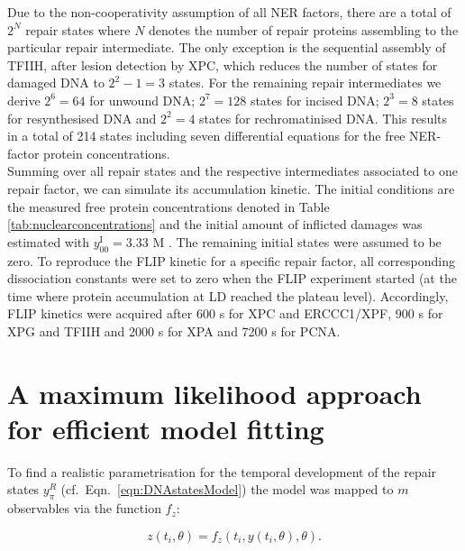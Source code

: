 Due to the non-cooperativity assumption of all NER factors, there are a total of $2^N$ repair states where $N$ denotes the number of repair proteins assembling to the particular repair intermediate. The only exception is the sequential assembly of TFIIH, after lesion detection by XPC, which reduces the number of states for damaged DNA to $ 2^2-1 = 3$ states. For the remaining repair intermediates we derive  $ 2^6 = 64$ for unwound DNA; $ 2^7 = 128$ states for incised DNA; $ 2^3 = 8$ states for resynthesised DNA and $ 2^2 = 4$ states for rechromatinised DNA. This results in a total of 214 states including seven differential equations for the free NER-factor protein concentrations. \\
Summing over all repair states and the respective intermediates associated to one repair factor, we can simulate its accumulation kinetic. The initial conditions are the measured free protein concentrations denoted in Table \ref{tab:nuclearconcentrations}\cite{Terstiege2010,Luijsterburg2010} and the initial amount of inflicted damages was estimated with  $y_{00}^{\text{I}} = 3.33$ \textmu M \cite{Verbruggen2014}. The remaining initial states were assumed to be zero. To reproduce the FLIP kinetic for a specific repair factor, all corresponding dissociation constants were set to zero when the FLIP experiment started (at the time where protein accumulation at LD reached the plateau level). Accordingly, FLIP kinetics were acquired after 600 s for XPC and ERCCC1/XPF, 900 s for XPG and TFIIH and 2000 s for XPA and 7200 s for PCNA. 


 

\section{A maximum likelihood approach for efficient model fitting}
\label{sec:maximumLL}
To find a realistic parametrisation for the temporal development of the repair states $y_\pi^R$ (cf.\ Eqn.\ \ref{eqn:DNAstatesModel}) the model was mapped to $m$ observables via the function $f_z$:

  \begin{equation}
  	z(t_i,\theta) = f_z(t_i,y(t_i,\theta),\theta).
  	\label{eqn:observable}
  \end{equation} 

